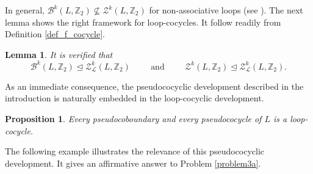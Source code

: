 \documentclass[11pt,a4paper]{article}
\newtheorem{lemma}[theorem]{Lemma}
\newtheorem{proposition}[theorem]{Proposition}
\begin{document}
In general, $\mathcal{B}^k(L,\mathbb{Z}_2)\not \subseteq \mathcal{Z}^k(L,\mathbb{Z}_2)$ for non-associative loops (see \citealp{Alvarez2020}). The next lemma shows the right framework for loop-cocycles. It follow readily from Definition \ref{def_f_cocycle}.

\begin{lemma}\label{lemma_subgroup} It is verified that
\[\mathcal{B}^k(L,\mathbb{Z}_2)\trianglelefteq \mathcal{Z}_{\mathcal{L}}^k(L,\mathbb{Z}_2) \hspace{1cm}\text{and}\hspace{1cm} \mathcal{Z}^k(L,\mathbb{Z}_2)\trianglelefteq \mathcal{Z}_{\mathcal{L}}^k(L,\mathbb{Z}_2).\]
\end{lemma}

As an immediate consequence, the pseudococyclic development described in the introduction is naturally embedded in the loop-cocyclic development.

\begin{proposition}\label{proposition_pseudocoboundary} Every pseudocoboundary and every pseudococycle of $L$ is a loop-cocycle.
\end{proposition}

The following example illustrates the relevance of this pseudococyclic development. It gives an affirmative answer to Problem \ref{problem3a}.
\end{document}
